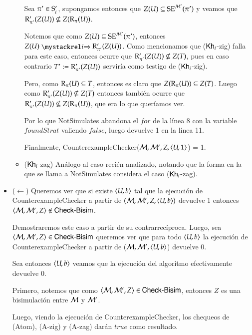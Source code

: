 \begin{demostracion}
\begin{itemize}
\begin{itemize}
            Sea $\pi' \in \S'_i$, supongamos entonces que $Z(U) \subseteq \sexec^{\model'}(\pi')$ y veamos que 
            $\R'_{\pi'}(Z(U)) \not \subseteq Z(\R_\pi(U))$.

            Notemos que como $Z(U) \subseteq \sexec^{\model'}(\pi')$, entonces $Z(U) \ultsExecAgi \R'_{\pi'}(Z(U))$. 
            Como mencionamos que ($\khi$-zig) falla para este caso, entonces ocurre que 
            $\R'_{\pi'}(Z(U)) \not \subseteq Z(T)$, pues en caso contrario $T' := \R'_{\pi'}(Z(U))$ serviría como 
            testigo de ($\khi$-zig).

            Pero, como $\R_\pi(U) \subseteq T$, entonces es claro que $Z(\R_\pi(U)) \subseteq Z(T)$. Luego como 
            $\R'_{\pi'}(Z(U)) \not \subseteq Z(T)$ entonces también ocurre que $\R'_{\pi'}(Z(U)) \not \subseteq Z(\R_\pi(U))$, 
            que era lo que queríamos ver.

            Por lo que \textsf{NotSimulates} abandona el $for$ de la línea 8 con la variable $foundStrat$ valiendo $false$, luego 
            devuelve 1 en la línea 11.

            Finalmente, \textsf{CounterexampleChecker}($\modults,\modults',Z,\tup{U,1}$) = 1.

            \item ($\khi$-zag) Análogo al caso recién analizado, notando que la forma en la que se llama a \textsf{NotSimulates}
            considera el caso ($\khi$-zag).
        \end{itemize}

        \item ($\leftarrow$) Queremos ver que si existe $\tup{U,b}$ tal que la ejecución de \textsf{CounterexampleChecker} a partir de 
        $(\model,\model',Z,\tup{U,b})$ devuelve 1 entonces $\tup{\model,\model',Z} \not\in \CBisim$. 

        Demostraremos este caso a partir de su contrarrecíproca. Luego, 
        sea $\tup{\modults,\modults',Z} \in \CBisim$ queremos ver que para todo $\tup{U,b}$ la ejecución de \textsf{CounterexampleChecker} 
        a partir de ($\modults,\modults',\tup{U,b}$) devuelve 0.

        Sea entonces $\tup{U,b}$ veamos que la ejecución del algoritmo efectivamente devuelve 0.

        Primero, notemos que como $\tup{\modults,\modults',Z} \in \CBisim$, entonces $Z$ es una bisimulación 
        entre $\modults$ y $\modults'$.

        Luego, viendo la ejecución de \textsf{CounterexampleChecker}, los chequeos de (Atom), (A-zig) y (A-zag) darán $true$ como resultado.
        

\end{itemize}
\end{demostracion}
